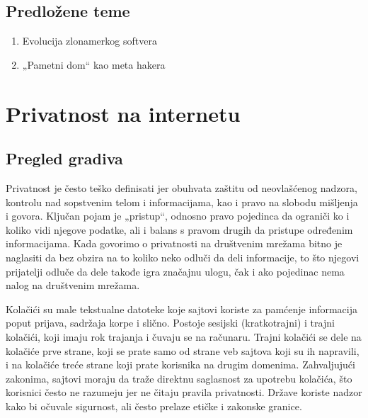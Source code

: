 \documentclass[12pt]{article}
\begin{document}
\subsection{Predložene teme}
\begin{enumerate}
    \item Evolucija zlonamerkog softvera 
    \item „Pametni dom“ kao meta hakera
\end{enumerate}

\section{Privatnost na internetu}
\subsection{Pregled gradiva}

Privatnost je često teško definisati jer obuhvata zaštitu od neovlašćenog nadzora, kontrolu nad sopstvenim telom i informacijama, kao i pravo na slobodu mišljenja i govora. Ključan pojam je „pristup“, odnosno pravo pojedinca da ograniči ko i koliko vidi njegove podatke, ali i balans s pravom drugih da pristupe određenim informacijama.
Kada govorimo o privatnosti na društvenim mrežama bitno je naglasiti da bez obzira na to koliko neko odluči da deli informacije, to što njegovi prijatelji odluče da dele takođe igra značajnu ulogu, čak i ako pojedinac nema nalog na društvenim mrežama.

Kolačići su male tekstualne datoteke koje sajtovi koriste za pamćenje informacija poput prijava, sadržaja korpe i slično. Postoje sesijski (kratkotrajni) i trajni kolačići, koji imaju rok trajanja i čuvaju se na računaru. Trajni kolačići se dele na kolačiće prve strane, koji se prate samo od strane veb sajtova koji su ih napravili, i na kolačiće treće strane koji prate korisnika na drugim domenima.
Zahvaljujući zakonima, sajtovi moraju da traže direktnu saglasnost za upotrebu kolačića, što korisnici često ne razumeju jer ne čitaju pravila privatnosti.
Države koriste nadzor kako bi očuvale sigurnost, ali često prelaze etičke i zakonske granice.
\end{document}
